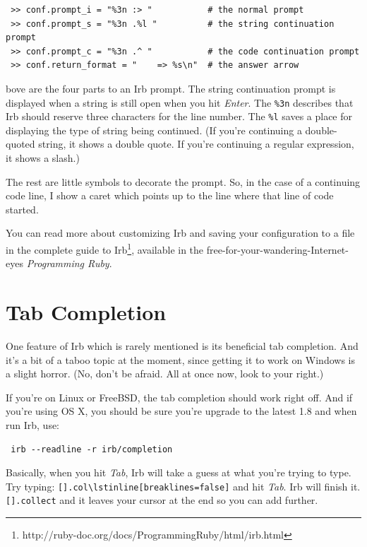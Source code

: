 \documentclass[10pt,twoside]{report}
\begin{document}
\begin{lstlisting}
 >> conf.prompt_i = "%3n :> "           # the normal prompt
 >> conf.prompt_s = "%3n .%l "          # the string continuation prompt
 >> conf.prompt_c = "%3n .^ "           # the code continuation prompt
 >> conf.return_format = "    => %s\n"  # the answer arrow
\end{lstlisting}

bove are the four parts to an Irb prompt. The string continuation
prompt is displayed when a string is still open when you hit
\emph{Enter}. The \lstinline[breaklines=false]|%3n| describes that Irb should reserve three characters for
the line number. The \lstinline[breaklines=false]|%l| saves a place for displaying the type of
string being continued. (If you're continuing a double-quoted string,
it shows a double quote. If you're continuing a regular expression, it
shows a slash.)

The rest are little symbols to decorate the prompt. So, in the case of
a continuing code line, I show a caret which points up to the line
where that line of code started.

You can read more about customizing Irb and saving your configuration
to a file in the complete guide to
Irb\footnote{http://ruby-doc.org/docs/ProgrammingRuby/html/irb.html},
available in the free-for-your-wandering-Internet-eyes
\emph{Programming Ruby}.

\section{Tab Completion}

One feature of Irb which is rarely mentioned is its beneficial tab
completion. And it's a bit of a taboo topic at the moment, since
getting it to work on Windows is a slight horror. (No, don't be
afraid. All at once now, look to your right.)

If you're on Linux or FreeBSD, the tab completion should work right
off. And if you're using OS X, you should be sure you're upgrade to
the latest 1.8 and when run Irb, use:

\begin{lstlisting}
 irb --readline -r irb/completion
\end{lstlisting}

Basically, when you hit \emph{Tab}, Irb will take a guess at what you're
trying to type. Try typing: \lstinline[breaklines=false]|[].col\lstinline[breaklines=false]| and hit \emph{Tab}. Irb will finish
it. \lstinline[breaklines=false]|[].collect| and it leaves your cursor at the end so you can add
further.
\end{document}
